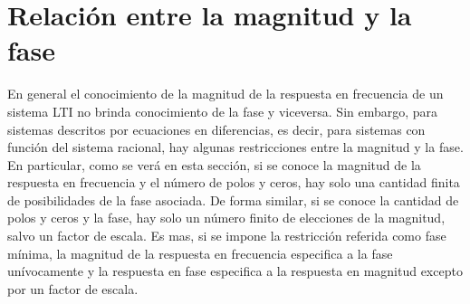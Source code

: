 \documentclass[a4paper]{report}
\begin{document}
\section{Relación entre la magnitud y la fase}\label{sec:transform_analysis_magnitude_and_phase_relation}

En general el conocimiento de la magnitud de la respuesta en frecuencia de un sistema LTI no brinda conocimiento de la fase y viceversa. Sin embargo, para sistemas descritos por ecuaciones en diferencias, es decir, para sistemas con función del sistema racional, hay algunas restricciones entre la magnitud y la fase. En particular, como se verá en esta sección, si se conoce la magnitud de la respuesta en frecuencia y el número de polos y ceros, hay solo una cantidad finita de posibilidades de la fase asociada. De forma similar, si se conoce la cantidad de polos y ceros y la fase, hay solo un número finito de elecciones de la magnitud, salvo un factor de escala. Es mas, si se impone la restricción referida como fase mínima, la magnitud de la respuesta en frecuencia especifica a la fase unívocamente y la respuesta en fase especifica a la respuesta en magnitud excepto por un factor de escala.
\end{document}
